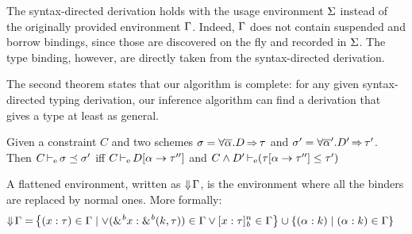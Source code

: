 The syntax-directed derivation holds with the usage environment $\Sv$ instead of the originally provided environment $\E$. Indeed,
$\E$ does not contain suspended and borrow bindings, since those
are discovered on the fly and recorded in $\Sv$. The type binding, however,
are directly taken from the syntax-directed derivation.

The second theorem states that our algorithm is complete: for any given
syntax-directed typing derivation, our inference algorithm can find
a derivation that gives a type at least as general.


\begin{definition}
  Given a constraint $C$ and two schemes
  $\schm = \forall \Multi\tvar. \qual{D}{\tau}$ and
  $\schm' = \forall \Multi\tvar'. \qual{D'}{\tau'} $.
  Then $\entail{C}{\schm \preceq \schm'}$
  iff $\entail{C}{\subst{\tvar}{\tau''} D}$
  and $\entail{C\Cand D'}{\Cleq{\subst{\tvar}{\tau''}\tau}{\tau'}}$
\end{definition}

\begin{definition}
A flattened environment,
written as $\Eflat\E$, is the environment
where all the binders are replaced by normal ones. More formally:
\begin{align*}
  \Eflat\E
  =& \left\{\bvar{x}{\tau}\in\E \mid
    \vee \bvar{\borrow{x}}{\borrowty{k}{\tau}}\in\E
    \vee \svar{x}{\tau}^n\in\E
    \right\}
     \cup \left\{ \bvar{\tvar}{k} \mid \bvar{\tvar}{k}\in\E \right\}
\end{align*}
\end{definition}




